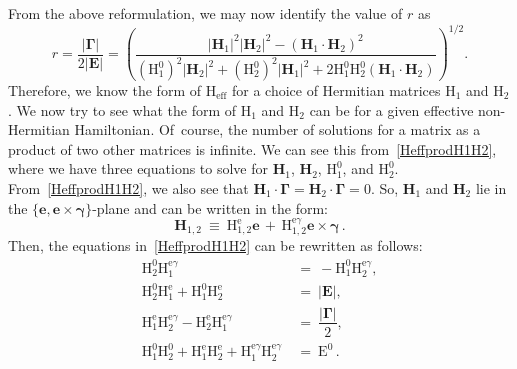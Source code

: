 \documentclass[12pt,a4paper]{article}
\begin{document}
From the above reformulation, we may now identify the value of $r$ as
\begin{equation}
    r = \dfrac{|\boldsymbol{\Gamma}|}{2|\mathbf{E}|} = \left(\dfrac{|\mathbf{H}_1|^2|\mathbf{H}_2|^2 - (\mathbf{H}_1\cdot\mathbf{H}_2)^2}{(\mathrm{H}_1^0)^2|\mathbf{H}_2|^2+(\mathrm{H}_2^0)^2|\mathbf{H}_1|^2+2\mathrm{H}_1^0\mathrm{H}_2^0(\mathbf{H}_1\cdot\mathbf{H}_2)}\right)^{1/2}.\label{prod2cuqr}
\end{equation}
Therefore, we know the form of $\mathrm{H}_{\text{eff}}$ for a choice of Hermitian matrices $\mathrm{H}_1$ and $\mathrm{H}_2$. We now try to see what the form of $\mathrm{H}_1$ and $\mathrm{H}_2$ can be for a given effective non-Hermitian Hamiltonian. Of~course, the number of solutions for a matrix as a product of two other matrices is infinite. We can see this from~\eqref{HeffprodH1H2}, where we have three equations to solve for $\mathbf{H}_1$, $\mathbf{H}_2$, $\mathrm{H}_1^0$, and $\mathrm{H}_2^0$. From~\eqref{HeffprodH1H2}, we also see that $\mathbf{H}_1\cdot\boldsymbol{\Gamma} = \mathbf{H}_2\cdot\boldsymbol{\Gamma} =0$. So, $\mathbf{H}_1$ and $\mathbf{H}_2$ lie in the $\{\mathbf{e},\mathbf{e}\times\boldsymbol{\gamma}\}$-plane and can be written in the form:
\begin{equation}
    \mathbf{H}_{1,2}\: \equiv\: \mathrm{H}_{1,2}^\mathrm{e}\mathbf{e}\, +\, \mathrm{H}_{1,2}^{\mathrm{e}\gamma}\mathbf{e}\times\boldsymbol{\gamma}\,.
\end{equation}
Then, the equations in~\eqref{HeffprodH1H2} can be rewritten as follows:
\begin{subequations}
  \label{CUQprodconstreqn}
    \begin{align}
    \mathrm{H}_2^0\mathrm{H}_{1}^{\mathrm{e}\gamma}\ &=\ -\mathrm{H}_1^0\mathrm{H}_{2}^{\mathrm{e}\gamma}\label{CUQprodconstr1},\\
    \mathrm{H}_2^0\mathrm{H}_{1}^{\mathrm{e} }+\mathrm{H}_1^0 \mathrm{H}_{2}^{\mathrm{e}}\ &=\ |\mathbf{E}|,\label{CUQprodconstr2}\\
    \mathrm{H}_{1}^{\mathrm{e}}\mathrm{H}_{2}^{\mathrm{e}\gamma}-\mathrm{H}_{2}^{\mathrm{e}}\mathrm{H}_{1}^{\mathrm{e}\gamma}\ &=\ \dfrac{|\boldsymbol{\Gamma}|}{2},\label{CUQprodconstr3}\\
    \mathrm{H}_1^0\mathrm{H}_2^0 + \mathrm{H}_1^{\mathrm{e}}\mathrm{H}_2^{\mathrm{e}}+ \mathrm{H}_1^{\mathrm{e}\gamma}\mathrm{H}_2^{\mathrm{e}\gamma}\ &=\ \mathrm{E}^0\,.\label{CUQprodconstr4}
    \end{align}    
\end{subequations}
\end{document}
